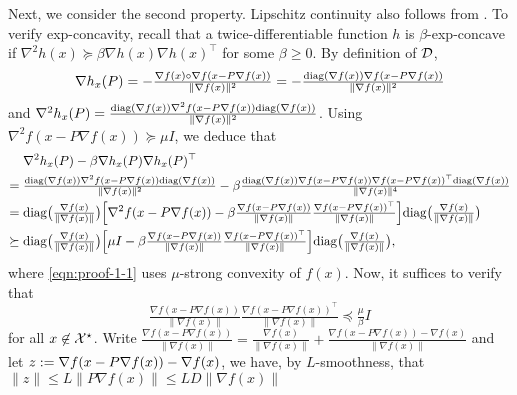 Next, we consider the second property. Lipschitz continuity also follows from \cite{gao2024gradient}. To verify exp-concavity, recall that a twice-differentiable function
$h$ is $\beta$-exp-concave if $\nabla^2 h (x) \succeq \beta \nabla h (x)
\nabla h (x)^{\top}$ for some $\beta \geq 0$. By definition of $\mathcal{D}$,
\[ \nabla h_x (P) = - \tfrac{\nabla f (x) \circ \nabla f (x - P \nabla f
   (x))}{\| \nabla f (x) \|^2} = - \tfrac{\mathrm{diag} (\nabla f (x)) \nabla f
   (x - P \nabla f (x))}{\| \nabla f (x) \|^2} \]
and $\nabla^2 h_x (P) = \frac{\mathrm{diag} (\nabla f (x)) \nabla^2 f (x - P
\nabla f (x)) \mathrm{diag} (\nabla f (x))}{\| \nabla f (x) \|^2}$. Using
$\nabla^2 f (x - P \nabla f (x)) \succeq \mu I$, we deduce that
\begin{align}
  & \nabla^2 h_x (P) - \beta\nabla h_x (P) \nabla h_x
  (P)^{\top} \nonumber\\
  ={} & \tfrac{\mathrm{diag} (\nabla f (x)) \nabla^2 f (x - P \nabla f (x))
  \mathrm{diag} (\nabla f (x))}{\| \nabla f (x) \|^2} - \beta \tfrac{\mathrm{diag}
  (\nabla f (x)) \nabla f (x - P \nabla f (x)) \nabla f (x - P \nabla f
  (x))^{\top} \mathrm{diag} (\nabla f (x))}{\| \nabla f (x) \|^4} \nonumber\\
  ={} & \mathrm{diag} \big( \tfrac{\nabla f (x)}{\| \nabla f (x) \|} \big)
  \Big[ \nabla^2 f (x - P \nabla f (x)) - \beta \tfrac{\nabla f (x - P \nabla
  f (x))}{\| \nabla f (x) \|} \tfrac{\nabla f (x - P \nabla f (x))^{\top}}{\| \nabla
  f (x) \|} \Big] \mathrm{diag} \big( \tfrac{\nabla f (x)}{\| \nabla f
  (x) \|} \big) \nonumber\\
  \succeq{} & \mathrm{diag} \big( \tfrac{\nabla f (x)}{\| \nabla f (x) \|}
  \big) \Big[ \mu I - \beta \tfrac{\nabla f (x - P \nabla f (x))}{\| \nabla
  f (x) \|} \tfrac{\nabla f (x - P \nabla f (x))^{\top}
}{\| \nabla f (x) \|}  \Big] \mathrm{diag} \big( \tfrac{\nabla f (x)}{\| \nabla f (x) \|} \big), \label{eqn:proof-1-1}
\end{align}
where \eqref{eqn:proof-1-1} uses $\mu$-strong convexity of $f(x)$. Now, it suffices to verify that
\begin{equation} \label{eqn:proof-1-2}
	\tfrac{\nabla f (x - P \nabla f (x))}{\| \nabla f (x) \|} \tfrac{\nabla f
   (x - P \nabla f (x))^{\top}}{\| \nabla f (x) \|} \preceq \tfrac{\mu}{\beta}  I
\end{equation}
for all $x \not\in \mathcal{X}^\star$.
Write $\tfrac{\nabla f (x - P \nabla f (x))}{\| \nabla f (x) \|} =
\tfrac{\nabla f (x)}{\| \nabla f (x) \|} + \tfrac{\nabla f (x - P \nabla f
(x)) - \nabla f (x)}{\| \nabla f (x) \|}$ and let $z := \nabla f (x -
P \nabla f (x)) - \nabla f (x)$, we have, by $L$-smoothness, that $\| z \| \leq L \|P \nabla f(x) \| \leq L D \| \nabla f (x) \|$
